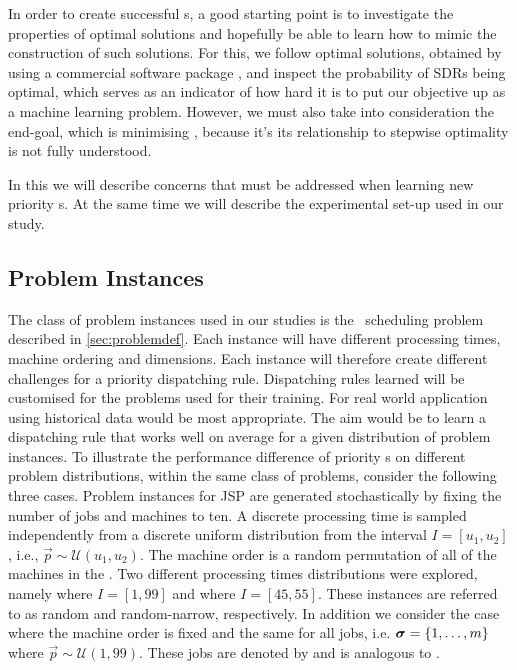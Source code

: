 \documentclass[smallextended]{svjour3}
\begin{document}
In order to create successful \dr s, a good starting point is to 
investigate the properties of optimal solutions and hopefully be able to learn 
how to mimic the construction of such solutions. For this, we follow optimal solutions, 
obtained by using a commercial software package \cite{gurobi}, and inspect 
the probability of SDRs being optimal, which serves as an indicator of how hard 
it is to put our objective up as a machine learning problem. 
However, we must also take into consideration the end-goal, which is minimising 
\namerho, because it's its relationship to stepwise optimality is not fully 
understood.


In this  we will describe concerns that must be 
addressed when learning new priority \dr s. At the same time we will describe 
the experimental set-up used in our study. 

\subsection{Problem Instances}\label{sec:data:sim}

The class of problem instances used in our studies is the \jsp\ scheduling 
problem described in \cref{sec:problemdef}. Each instance will have 
different processing times, machine ordering and dimensions. Each instance will 
therefore create different challenges for a priority dispatching rule. 
Dispatching rules learned will be customised for the problems used for their 
training. For real world application using historical data would be most 
appropriate. The aim would be to learn a dispatching rule that works well on 
average for a given distribution of problem instances. To illustrate the performance 
difference of priority \dr s on different problem distributions, 
within the same class of problems, consider the following three cases.
Problem instances for JSP are generated stochastically by fixing the number of 
jobs and machines to ten. A discrete processing time is sampled independently 
from a discrete uniform distribution from the interval $I=[u_1,u_2]$, i.e., 
$\vec{p}\sim \mathcal{U}(u_1,u_2)$. 
The machine order is a random permutation of all of the machines in the 
\jsp. Two different processing times distributions were explored, namely 
 where $I=[1,99]$ and  where $I=[45,55]$. These 
instances are referred to as random and random-narrow, respectively. In 
addition we consider the case where the machine order is fixed and the same for 
all jobs, i.e. $\bm \sigma=\{1,\ldots,m\}$ where 
$\vec{p}\sim\mathcal{U}(1,99)$. 
These jobs are denoted by  and is analogous to .
\end{document}
